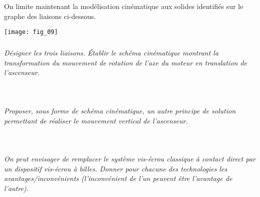\begin{multicols}{2}
On limite maintenant la modélisation cinématique aux solides identifiés sur le graphe des liaisons ci-dessous.
\begin{center}
\texttt{[image: fig\_09]}
\end{center}

\subparagraph{}\textit{Désigner les trois liaisons. Établir le schéma cinématique montrant la transformation
du mouvement de rotation de l’axe du moteur en translation de l’ascenseur.}
\ifprof
\begin{corrige}~\\
\end{corrige}
\else
\fi


\subparagraph{}\textit{Proposer, sous forme de schéma cinématique, un autre principe de solution
permettant de réaliser le mouvement vertical de l’ascenseur.}
\ifprof
\begin{corrige}~\\
\end{corrige}
\else
\fi


\subparagraph{}\textit{On peut envisager de remplacer le système vis-écrou classique à contact
direct par un dispositif vis-écrou à billes. Donner pour chacune des technologies les avantages/inconvénients (l'inconvénient de l'un peuvent être l'avantage de l'autre).}%
\ifprof
\begin{corrige}~\\
\end{corrige}
\else
\fi
%
%
%
%
%
%


\end{multicols}
